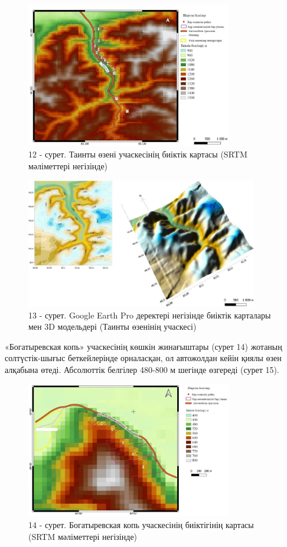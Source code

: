 \begin{figure}[H]
	\centering
	\includegraphics[width=0.8\textwidth]{media/ict2/image215}
	\caption*{12 - сурет. Таинты өзені учаскесінің биіктік картасы (SRTM мәліметтері негізінде)}
\end{figure}

\begin{figure}[H]
	\centering
	\includegraphics[width=0.9\textwidth]{media/ict2/image216}
	\caption*{13 - сурет. Google Earth Pro деректері негізінде биіктік карталары мен 3D модельдері (Таинты өзенінің учаскесі)}
\end{figure}

«Богатыревская копь» учаскесінің көшкін жинағыштары (сурет 14) жотаның
солтүстік-шығыс беткейлерінде орналасқан, ол автожолдан кейін қиялы өзен
алқабына өтеді. Абсолюттік белгілер 480-800 м шегінде өзгереді (сурет
15).

\begin{figure}[H]
	\centering
	\includegraphics[width=0.8\textwidth]{media/ict2/image217}
	\caption*{14 - сурет. Богатыревская копь учаскесінің биіктігінің картасы (SRTM мәліметтері негізінде)}
\end{figure}

